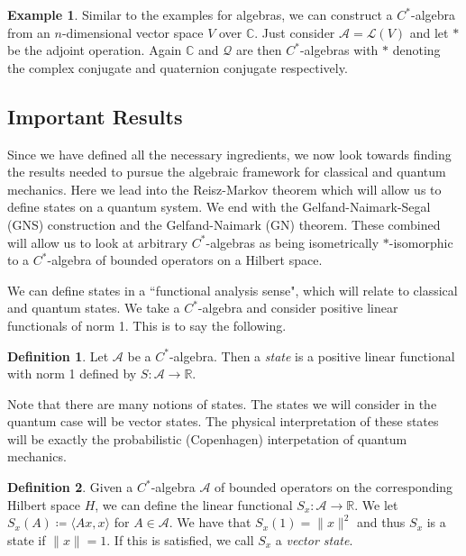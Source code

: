 \documentclass[leqno]{article}
\theoremstyle{definition}
\newtheorem{definition}{Definition}[section]
\newtheorem*{example}{Example}
\theoremstyle{remark}
\theoremstyle{theorem}
\newcommand{\R}{\mathbb{R}}
\newcommand{\A}{\mathcal{A}}
\newcommand{\C}{\mathbb{C}}
\begin{document}
\begin{example}
Similar to the examples for algebras, we can construct a $C^*$-algebra from an $n$-dimensional vector space $V$ over $\C$.  Just consider $\A=\mathcal{L}(V)$ and let $*$ be the adjoint operation.  Again $\C$ and $\mathcal{Q}$ are then $C^*$-algebras with $*$ denoting the complex conjugate and quaternion conjugate respectively.
\end{example}


\subsection{Important Results}

Since we have defined all the necessary ingredients, we now look towards finding the results needed to pursue the algebraic framework for classical and quantum mechanics.  Here we lead into the Reisz-Markov theorem which will allow us to define states on a quantum system.  We end with the Gelfand-Naimark-Segal (GNS) construction and the Gelfand-Naimark (GN) theorem.  These combined will allow us to look at arbitrary $C^*$-algebras as being isometrically $*$-isomorphic to a $C^*$-algebra of bounded operators on a Hilbert space.

We can define states in a ``functional analysis sense", which will relate to classical and quantum states.  We take a $C^*$-algebra and consider positive linear functionals of norm 1.  This is to say the following.

\begin{definition}
Let $\A$ be a $C^*$-algebra.  Then a \emph{state} is a positive linear functional with norm 1 defined by $S\colon \A \to \R$.  
\end{definition}

\noindent Note that there are many notions of states.  The states we will consider in the quantum case will be vector states.  The physical interpretation of these states will be exactly the probabilistic (Copenhagen) interpetation of quantum mechanics.

\begin{definition}
Given a $C^*$-algebra $\A$ of bounded operators on the corresponding Hilbert space $H$, we can define the linear functional $S_x \colon \A \to \R$.  We let $S_x(A)\coloneq \langle Ax,x\rangle$ for $A\in \A$.  We have that $S_x(1)=\|x\|^2$ and thus $S_x$ is a state if $\|x\|=1$. If this is satisfied, we call $S_x$ a \emph{vector state}.
\end{definition}
\end{document}
